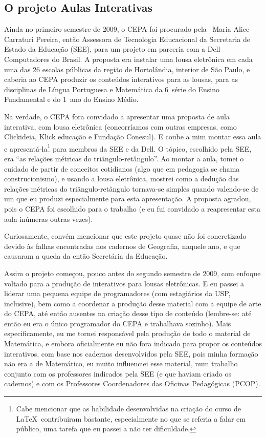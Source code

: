 \subsection{O projeto Aulas Interativas}
\label{sec:aulas-interativas}

Ainda no primeiro semestre de 2009, o CEPA foi procurado pela \profa\ Maria Alice Carraturi Pereira, então Assessora de Tecnologia Educacional da Secretaria de Estado da Educação (SEE), para um projeto em parceria com a Dell Computadores do Brasil. A proposta era instalar uma lousa eletrônica em cada uma das 26 escolas públicas da região de Hortolândia, interior de São Paulo, e caberia ao CEPA produzir os conteúdos interativos para as lousas, para as disciplinas de Língua Portuguesa e Matemática da 6\textordfeminine\ série do Ensino Fundamental e do 1\textordmasculine\ ano do Ensino Médio.

Na verdade, o CEPA fora convidado a apresentar uma proposta de aula interativa, com lousa eletrônica (concorríamos com outras empresas, como Clickideia, Klick educação e Fundação Conesul). E coube a mim montar essa aula e apresentá-la\footnote{Cabe mencionar que as habilidade desenvolvidas na criação do curso de \LaTeX\ contribuiram bastante, especialmente no que se referia a falar em público, uma tarefa que eu passei a não ter dificuldade.} para membros da SEE e da Dell. O tópico, escolhido pela SEE, era ``as relações métricas do triângulo-retângulo''. Ao montar a aula, tomei o cuidado de partir de conceitos cotidianos (algo que em pedagogia se chama construcionismo), e usando a lousa eletrônica, mostrei como a dedução das relações métricas do triângulo-retângulo tornava-se simples quando valendo-se de um  que eu produzi especialmente para esta apresentação. A proposta agradou, pois o CEPA foi escolhido para o trabalho (e eu fui convidado a reapresentar esta aula inúmeras outras vezes).

Curiosamente, convém mencionar que este projeto quase não foi concretizado devido às falhas encontradas nos cadernos de Geografia, naquele ano, e que causaram a queda da então Secretária da Educação.

Assim o projeto começou, pouco antes do segundo semestre de 2009, com enfoque voltado para a produção de  interativos para lousas eletrônicas. E eu passei a liderar uma pequena equipe de programadores (com estagiários da USP, inclusive), bem como a coordenar a produção desse material com a equipe de arte do CEPA, até então ausentes na criação desse tipo de conteúdo (lembre-se: até então eu era o único programador do CEPA e trabalhava sozinho). Mais especificamente, eu me tornei responsável pela produção de todo o material de Matemática, e embora oficialmente eu não fora indicado para propor os conteúdos interativos, com base nos cadernos desenvolvidos pela SEE, pois minha formação não era a de Matemático, eu muito influenciei esse material, num trabalho conjunto com os professores indicados pela SEE (e que haviam criado os cadernos) e com os Professores Coordenadores das Oficinas Pedagógicas (PCOP).

